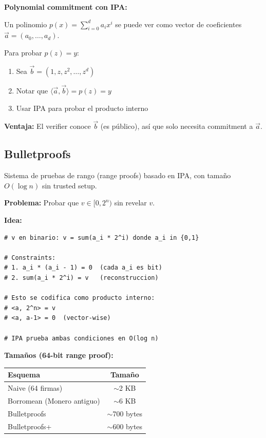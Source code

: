 \documentclass[11pt,a4paper,twoside]{book}
\begin{document}
\begin{keyidea}
\textbf{Polynomial commitment con IPA:}

Un polinomio $p(x) = \sum_{i=0}^{d} a_i x^i$ se puede ver como vector de coeficientes $\vec{a} = (a_0, \ldots, a_d)$.

Para probar $p(z) = y$:
\begin{enumerate}
    \item Sea $\vec{b} = (1, z, z^2, \ldots, z^d)$
    \item Notar que $\langle \vec{a}, \vec{b} \rangle = p(z) = y$
    \item Usar IPA para probar el producto interno
\end{enumerate}

\textbf{Ventaja:} El verifier conoce $\vec{b}$ (es p\'ublico), as\'i que solo necesita commitment a $\vec{a}$.
\end{keyidea}

\subsection{Bulletproofs}

\begin{definition}[Bulletproofs]
Sistema de pruebas de rango (range proofs) basado en IPA, con tama\~no $O(\log n)$ sin trusted setup.
\end{definition}

\begin{example}
\textbf{Problema:} Probar que $v \in [0, 2^n)$ sin revelar $v$.

\textbf{Idea:}
\begin{lstlisting}[style=python]
# v en binario: v = sum(a_i * 2^i) donde a_i in {0,1}

# Constraints:
# 1. a_i * (a_i - 1) = 0  (cada a_i es bit)
# 2. sum(a_i * 2^i) = v   (reconstruccion)

# Esto se codifica como producto interno:
# <a, 2^n> = v
# <a, a-1> = 0  (vector-wise)

# IPA prueba ambas condiciones en O(log n)
\end{lstlisting}

\textbf{Tama\~nos (64-bit range proof):}
\begin{center}
\begin{tabular}{lc}
\toprule
\textbf{Esquema} & \textbf{Tama\~no} \\
\midrule
Naive (64 firmas) & $\sim$2 KB \\
Borromean (Monero antiguo) & $\sim$6 KB \\
Bulletproofs & $\sim$700 bytes \\
Bulletproofs+ & $\sim$600 bytes \\
\bottomrule
\end{tabular}
\end{center}
\end{example}
\end{document}
